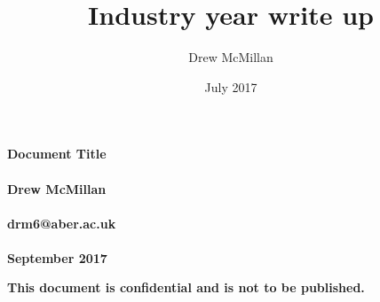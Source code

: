 \documentclass[12pt]{article}
\title{Industry year write up}
\author{Drew McMillan}
\date{July 2017}
\begin{document}
\begin{titlepage}
    \begin{center}
        \vspace*{1cm}
        \Large
        \textbf{Document Title}\\~\\
		\normalsize
        \textbf{Drew McMillan}\\~\\
        \textbf{drm6@aber.ac.uk}\\~\\
        \textbf{September 2017}
        \vfill
        
       
        
        
        \textbf{This document is confidential and is not to be published.}
        
        
    \end{center}
\end{titlepage}

\newpage
\end{document}
